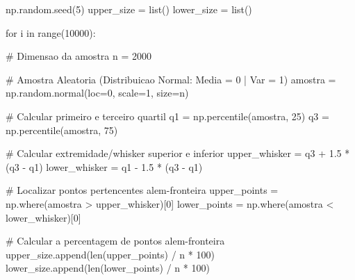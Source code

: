 



\begin{code}[caption={Simulação em Python para calcular percentagem de outliers numa distribuição normal.},captionpos=b, label=lst:normalcode,
	language=python,
	showspaces=false,
	showstringspaces=false,
	basicstyle=\ttfamily,
	numbers=left,
	numberstyle=\tiny,
	commentstyle=\color{gray}, 
	frame=single,
	autogobble=true,
	breaklines=true,
	postbreak=\mbox{\textcolor{red}{$\hookrightarrow$}\space},
	]
	np.random.seed(5)	
	upper_size = list()
	lower_size = list()
	
	for i in range(10000):
	
		# Dimensao da amostra
		n = 2000
		
		# Amostra Aleatoria (Distribuicao Normal: Media = 0 | Var = 1)
		amostra = np.random.normal(loc=0, scale=1, size=n)
		
		# Calcular primeiro e terceiro quartil
		q1 = np.percentile(amostra, 25)
		q3 = np.percentile(amostra, 75)
		
		# Calcular extremidade/whisker superior e inferior
		upper_whisker = q3 + 1.5 * (q3 - q1)
		lower_whisker = q1 - 1.5 * (q3 - q1)
		
		# Localizar pontos pertencentes alem-fronteira
		upper_points = np.where(amostra > upper_whisker)[0]
		lower_points = np.where(amostra < lower_whisker)[0]
		
		# Calcular a percentagem de pontos alem-fronteira
		upper_size.append(len(upper_points) / n * 100)
		lower_size.append(len(lower_points) / n * 100)
	
\end{code}


